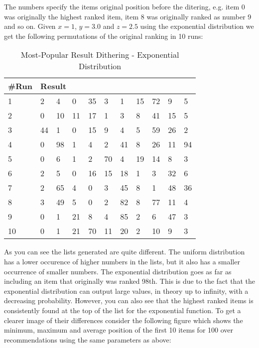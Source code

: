 The numbers specify the items original position before the ditering, e.g. item 0 was originally
the highest ranked item, item 8 was originally ranked as number 9 and so on. Given $x=1$, $y=3.0$
and $z=2.5$ using the exponential distribution we get the following permutations of the original
ranking in 10 runs:

\begin{table}[H]
	\centering
	\begin{tabular}{*{11}l}
	\toprule
	\multicolumn{1}{l}{\#Run} & \multicolumn{10}{l}{Result} \\ \midrule
	1	& 2 &  4 &  0 &  35 &  3 &  1 &  15 &  72 &  9 &  5\\
	2	& 0 &  10 &  11 &  17 &  1 &  3 &  8 &  41 &  15 &  5\\
	3	& 44 &  1 &  0 &  15 &  9 &  4 &  5 &  59 &  26 &  2\\
	4	& 0 &  98 &  1 &  4 &  2 &  41 &  8 &  26 &  11 &  94\\
	5	& 0 &  6 &  1 &  2 &  70 &  4 &  19 &  14 &  8 &  3\\
	6	& 2 &  5 &  0 &  16 &  15 &  18 &  1 &  3 &  32 &  6\\
	7	& 2 &  65 &  4 &  0 &  3 &  45 &  8 &  1 &  48 &  36\\
	8	& 3 &  49 &  5 &  0 &  2 &  82 &  8 &  77 &  11 &  4\\
	9	& 0 &  1 &  21 &  8 &  4 &  85 &  2 &  6 &  47 &  3\\
	10	& 0 &  1 &  21 &  70 &  11 &  20 &  2 & 10 & 9& 3 \\
	\bottomrule
\end{tabular}
\caption{Most-Popular Result Dithering - Exponential Distribution}
\end{table}

As you can see the lists generated are quite different. The uniform distribution has a lower occurence of higher
numbers in the lists, but it also has a smaller occurrence of smaller numbers. The exponential distribution
goes as far as including an item that originally was ranked 98th. This is due to the fact that the exponential
distribution can output large values, in theory up to infinity, with a decreasing probability.
However, you can also see that the highest ranked items is consistently found at the top of the list
for the exponential function.
To get a clearer image of their differences consider the following figure which shows the minimum, maximum and average position of
the first 10 items for 100 over recommendations using the same parameters as above:

